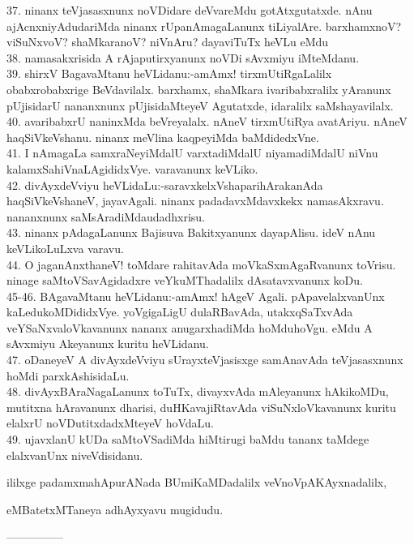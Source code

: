 \documentclass{article}
\begin{document}
37. ninanx teVjasasxnunx noVDidare deVvareMdu gotAtxgutatxde. nAnu ajAcnxniyAdudariMda ninanx rUpanAmagaLanunx tiLiyalAre. barxhamxnoV? viSuNxvoV? shaMkaranoV? niVnAru? dayaviTuTx heVLu eMdu\\
38. namasakxrisida A rAjaputirxyanunx noVDi sAvxmiyu iMteMdanu.\\
39. shirxV BagavaMtanu heVLidanu:-amAmx! tirxmUtiRgaLalilx obabxrobabxrige BeVdavilalx. barxhamx, shaMkara ivaribabxralilx yAranunx pUjisidarU nananxnunx pUjisidaMteyeV Agutatxde, idaralilx saMshayavilalx.\\
40. avaribabxrU naninxMda beVreyalalx. nAneV tirxmUtiRya avatAriyu. nAneV haqSiVkeVshanu. ninanx meVlina kaqpeyiMda baMdidedxVne.\\
41. I nAmagaLa samxraNeyiMdalU varxtadiMdalU niyamadiMdalU niVnu kalamxSahiVnaLAgididxVye. varavanunx keVLiko.\\
42. divAyxdeVviyu heVLidaLu:-saravxkelxVshaparihArakanAda haqSiVkeVshaneV, jayavAgali. ninanx padadavxMdavxkekx namasAkxravu. nananxnunx saMsAradiMdaudadhxrisu.\\
43. ninanx pAdagaLanunx Bajisuva Bakitxyanunx dayapAlisu. ideV nAnu keVLikoLuLxva varavu.\\
44. O jaganAnxthaneV! toMdare rahitavAda moVkaSxmAgaRvanunx toVrisu. ninage saMtoVSavAgidadxre veYkuMThadalilx dAsatavxvanunx koDu.\\
45-46. BAgavaMtanu heVLidanu:-amAmx! hAgeV Agali. pApavelalxvanUnx kaLedukoMDididxVye. yoVgigaLigU dulaRBavAda, utakxqSaTxvAda veYSaNxvaloVkavanunx nananx anugarxhadiMda hoMduhoVgu. eMdu A sAvxmiyu Akeyanunx kuritu heVLidanu.\\
47. oDaneyeV A divAyxdeVviyu sUrayxteVjasisxge samAnavAda teVjasasxnunx hoMdi parxkAshisidaLu.\\
48. divAyxBAraNagaLanunx toTuTx, divayxvAda mAleyanunx hAkikoMDu, mutitxna hAravanunx dharisi, duHKavajiRtavAda viSuNxloVkavanunx kuritu elalxrU noVDutitxdadxMteyeV hoVdaLu.\\
49. ujavxlanU kUDa saMtoVSadiMda hiMtirugi baMdu tananx taMdege elalxvanUnx niveVdisidanu.

\begin{center}
ililxge padamxmahApurANada BUmiKaMDadalilx veVnoVpAKAyxnadalilx,
\end{center}

\begin{center}
eMBatetxMTaneya adhAyxyavu mugidudu.
\end{center}

\begin{center}
---------------
\end{center}
\end{document}
